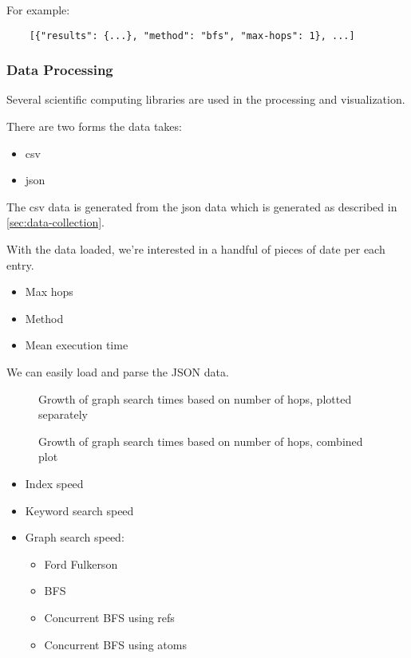 				For example:
				
				\begin{verbatim}
	[{"results": {...}, "method": "bfs", "max-hops": 1}, ...]
				\end{verbatim}
			
			\subsubsection{Data Processing}
			\label{sec:data-processing}
				Several scientific computing libraries are used in the processing and visualization.
				
				There are two forms the data takes:
				
				\begin{itemize}
					\item \gls{csv}
					\item \gls{json}
				\end{itemize}
				
				The \gls{csv} data is generated from the \gls{json} data which is generated as described in \vref{sec:data-collection}.
				
				With the data loaded, we're interested in a handful of pieces of date per each entry.
				
				\begin{itemize}
					\item Max hops
					\item Method
					\item Mean execution time
				\end{itemize}
				
				We can easily load and parse the JSON data.
				
				\begin{figure}
					\centering
					\resizebox{\linewidth}{!}{
						
					}
					\caption{Growth of graph search times based on number of hops, plotted separately}
					\label{fig:methods-subplots}
				\end{figure}
				
				\begin{figure}
					\centering
					\resizebox{\linewidth}{!}{
						
					}
					
					\caption{Growth of graph search times based on number of hops, combined plot}
					\label{fig:methods-compared}
				\end{figure}
		
		\begin{itemize}
			\item Index speed
			\item Keyword search speed
			\item Graph search speed:
				\begin{itemize}
					\item Ford Fulkerson
					\item BFS
					\item Concurrent BFS using refs
					\item Concurrent BFS using atoms
				\end{itemize}
		\end{itemize}
	

